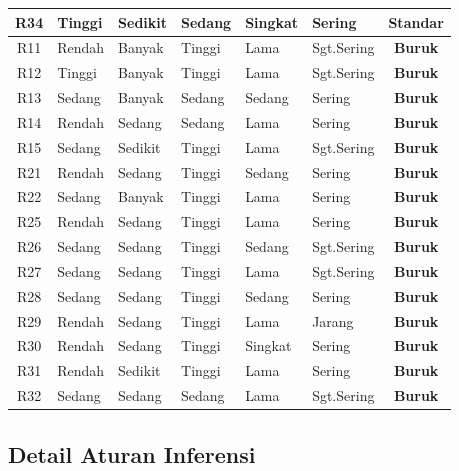 \documentclass[12pt,a4paper]{report}
\begin{document}
\begin{table}[H]
\begin{tabular}{|c|l|l|l|l|l|c|}
    R34 & Tinggi & Sedikit & Sedang & Singkat & Sering    & \textbf{Standar} \\ \hline
    R11 & Rendah & Banyak  & Tinggi & Lama    & Sgt.Sering & \textbf{Buruk} \\ \hline
    R12 & Tinggi & Banyak  & Tinggi & Lama    & Sgt.Sering & \textbf{Buruk} \\ \hline
    R13 & Sedang & Banyak  & Sedang & Sedang  & Sering    & \textbf{Buruk} \\ \hline
    R14 & Rendah & Sedang  & Sedang & Lama    & Sering    & \textbf{Buruk} \\ \hline
    R15 & Sedang & Sedikit & Tinggi & Lama    & Sgt.Sering & \textbf{Buruk} \\ \hline
    R21 & Rendah & Sedang  & Tinggi & Sedang  & Sering    & \textbf{Buruk} \\ \hline
    R22 & Sedang & Banyak  & Tinggi & Lama    & Sering    & \textbf{Buruk} \\ \hline
    R25 & Rendah & Sedang  & Tinggi & Lama    & Sering    & \textbf{Buruk} \\ \hline
    R26 & Sedang & Sedang  & Tinggi & Sedang  & Sgt.Sering & \textbf{Buruk} \\ \hline
    R27 & Sedang & Sedang  & Tinggi & Lama    & Sgt.Sering & \textbf{Buruk} \\ \hline
    R28 & Sedang & Sedang  & Tinggi & Sedang  & Sering    & \textbf{Buruk} \\ \hline
    R29 & Rendah & Sedang  & Tinggi & Lama    & Jarang    & \textbf{Buruk} \\ \hline
    R30 & Rendah & Sedang  & Tinggi & Singkat & Sering    & \textbf{Buruk} \\ \hline
    R31 & Rendah & Sedikit & Tinggi & Lama    & Sering    & \textbf{Buruk} \\ \hline
    R32 & Sedang & Sedang  & Sedang & Lama    & Sgt.Sering & \textbf{Buruk} \\ \hline
  \end{tabular}
\end{table}

\subsection{Detail Aturan Inferensi}
\end{document}
